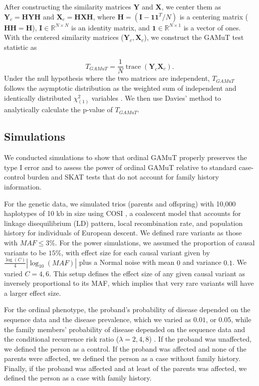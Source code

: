 \documentclass[]{article}
\DeclareMathOperator{\trace}{trace}
\theoremstyle{definition}
\theoremstyle{definition}
\theoremstyle{definition}
\theoremstyle{remark}
\begin{document}
After constructing the similarity matrices \(\mathbf{Y}\) and
\(\mathbf{X}\), we center them as \(\mathbf{Y}_c = \mathbf{HYH}\) and
\(\mathbf{X}_c = \mathbf{HXH}\), where
\(\mathbf{H}=(\mathbf{I}-\mathbf{11}^T/N)\) is a centering matrix
(\(\mathbf{HH} = \mathbf{H}\)),
\(\mathbf{I} \in \mathbb{R}^{N \times N}\) is an identity matrix, and
\(\mathbf{1} \in \mathbb{R}^{N \times 1}\) is a vector of ones. With the
centered similarity matrices (\(\mathbf{Y}_c, \mathbf{X}_c\)), we
construct the GAMuT test statistic as

\[
T_{GAMuT}=\frac{1}{N}\trace(\mathbf{Y}_c\mathbf{X}_c).
\] Under the null hypothesis where the two matrices are independent,
\(T_{GAMuT}\) follows the asymptotic distribution as the weighted sum of
independent and identically distributed \(\chi^2_{(1)}\) variables
\citep{Broadaway2016}. We then use Davies' method \citep{Davies1980} to
analytically calculate the p-value of \(T_{GAMuT}\).

\hypertarget{simulations}{%
\subsection{Simulations}\label{simulations}}

We conducted simulations to show that ordinal GAMuT properly preserves
the type I error and to assess the power of ordinal GAMuT relative to
standard case-control burden \citep{Li2008} and SKAT \citep{Wu2011}
tests that do not account for family history information.

For the genetic data, we simulated trios (parents and offspring) with
10,000 haplotypes of 10 kb in size using COSI \citep{cosi}, a coalescent
model that accounts for linkage disequilibrium (LD) pattern, local
recombination rate, and population history for individuals of European
descent. We defined rare variants as those with \(MAF \leq 3\%\). For
the power simulations, we assumed the proportion of causal variants to
be \(15\%\), with effect size for each causal variant given by
\(\frac{\log(C)}{4}|\log_{10}(MAF)|\) plus a Normal noise with mean
\(0\) and variance \(0.1\). We varied \(C=4,6\). This setup defines the
effect size of any given causal variant as inversely proportional to its
MAF, which implies that very rare variants will have a larger effect
size.

For the ordinal phenotype, the proband's probability of disease depended
on the sequence data and the disease prevalence, which we varied as
\(0.01\), or \(0.05\), while the family members' probability of disease
depended on the sequence data and the conditional recurrence risk ratio
(\(\lambda=2,4,8\)) \citep{Epstein2015}. If the proband was unaffected,
we defined the person as a control. If the proband was affected and none
of the parents were affected, we defined the person as a case without
family history. Finally, if the proband was affected and at least of the
parents was affected, we defined the person as a case with family
history.
\end{document}
